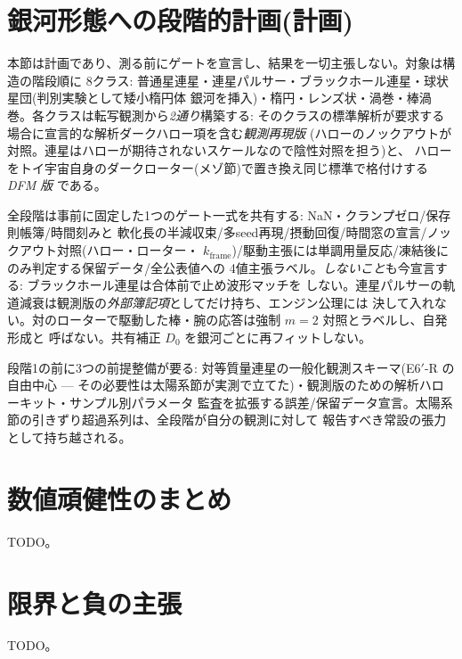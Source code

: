\documentclass[a4paper,10pt,twocolumn]{ltjsarticle}
\begin{document}
\section{銀河形態への段階的計画(計画)}

本節は計画であり、測る前にゲートを宣言し、結果を一切主張しない。対象は構造の階段順に
8クラス: 普通星連星・連星パルサー・ブラックホール連星・球状星団(判別実験として矮小楕円体
銀河を挿入)・楕円・レンズ状・渦巻・棒渦巻。各クラスは転写観測から\emph{2通り}構築する:
そのクラスの標準解析が要求する場合に宣言的な解析ダークハロー項を含む\emph{観測再現版}
(ハローのノックアウトが対照。連星はハローが期待されないスケールなので陰性対照を担う)と、
ハローをトイ宇宙自身のダークローター(メゾ節)で置き換え同じ標準で格付けする \emph{DFM 版}
である。

全段階は事前に固定した1つのゲート一式を共有する: NaN・クランプゼロ/保存則帳簿/時間刻みと
軟化長の半減収束/多seed再現/摂動回復/時間窓の宣言/ノックアウト対照(ハロー・ローター・
$k_{\mathrm{frame}}$)/駆動主張には単調用量反応/凍結後にのみ判定する保留データ/全公表値への
4値主張ラベル。\emph{しないこと}も今宣言する: ブラックホール連星は合体前で止め波形マッチを
しない。連星パルサーの軌道減衰は観測版の\emph{外部簿記項}としてだけ持ち、エンジン公理には
決して入れない。対のローターで駆動した棒・腕の応答は強制 $m{=}2$ 対照とラベルし、自発形成と
呼ばない。共有補正 $D_0$ を銀河ごとに再フィットしない。

段階1の前に3つの前提整備が要る: 対等質量連星の一般化観測スキーマ(E6$'$-R の自由中心 —
その必要性は太陽系節が実測で立てた)・観測版のための解析ハローキット・サンプル別パラメータ
監査を拡張する誤差/保留データ宣言。太陽系節の引きずり超過系列は、全段階が自分の観測に対して
報告すべき常設の張力として持ち越される。

\section{数値頑健性のまとめ}
TODO。

\section{限界と負の主張}
TODO。
\end{document}
